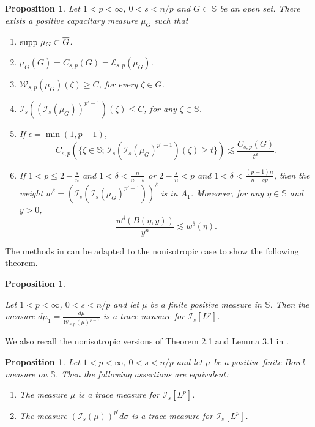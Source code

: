 \documentclass[12pt,twoside,leqno,final]{amsart}
\theoremstyle{plain}
\newtheorem{prop}[thm]{Proposition}
\begin{document}
\begin{prop}\label{prop:extremalcapacity} Let $1<p<\infty$, $0<s<n/p$ and $G\subset{{\mathbb S}}$ be an open set. There exists a positive capacitary measure $\mu_G$ such that
 \begin{enumerate}
 \item[(i)] ${\rm supp}\,\, \mu_G\subset \overline{G}$.
 
 \item[(ii)] $\mu_G(\overline{G})=C_{s,p} (G)={\mathcal E}_{s,p} (\mu_G)$.
 
 \item[(iii)] ${\mathcal W}_{s,p} (\mu_G)(\zeta)\geq C$, for every $\zeta\in G$.
 
 \item[(iv)] $\mathcal{I}_s((\mathcal{I}_s (\mu_G))^{p'-1})(\zeta)\leq C$, for any $\zeta\in {{\mathbb S}}$.
 \item[(v)] If $\epsilon= \min(1,p-1)$, $$C_{s,p}(\{\zeta\in{{\mathbb S}};\, \mathcal{I}_s(\mathcal{I}_s(\mu_G)^{p'-1})(\zeta)\geq t\}) \lesssim \frac{C_{s,p}(G)}{t^\epsilon}.$$
 \item[(vi)] If $1<p\leq 2-\frac{s}{n}$ and $1<\delta<\frac{n}{n-s}$ or $2-\frac{s}{n}<p$ and $1<\delta<\frac{(p-1)n}{n-sp}$, then the weight $w^\delta=(\mathcal{I}_s(\mathcal{I}_s(\mu_G)^{p'-1}))^\delta$ is in $A_1$. Moreover, for any $\eta \in {{\mathbb S}}$ and $y>0$, \begin{equation}\label{eqn:a1}\frac{w^\delta(B(\eta,y))}{y^n}\lesssim w^\delta(\eta).\end{equation}
 \end{enumerate}
\end{prop}

The methods in \cite{cascanteortegaverbitsky} can be adapted to the nonisotropic case to show the following theorem.

\begin{prop}\label{prop:tracemeasure1}

 Let $1<p<\infty$, $0<s<n/p$ and let $\mu$ be a  finite positive measure in ${{\mathbb S}}$. Then the measure $d\mu_1=\frac{d\mu}{{\mathcal W}_{s,p}(\mu)^{p-1}}$ is a trace measure for $\mathcal{I}_s[L^p]$.
 \end{prop}

We also recall the nonisotropic versions of Theorem  2.1  and Lemma 3.1 in \cite{mazyaverbitsky}.

\begin{prop}\label{prop:tracemeasure2}
Let $1<p<\infty$, $0<s<n/p$ and let $\mu$ be a positive finite Borel measure on ${{\mathbb S}}$. Then the following assertions are equivalent:
\begin{enumerate}
\item The measure $\mu$ is a trace measure for $\mathcal{I}_s[L^p]$.
\item The measure $(\mathcal{I}_s(\mu))^{p'}d\sigma$ is a trace measure for $\mathcal{I}_s[L^p]$.
\end{enumerate} 
\end{prop}
\end{document}

